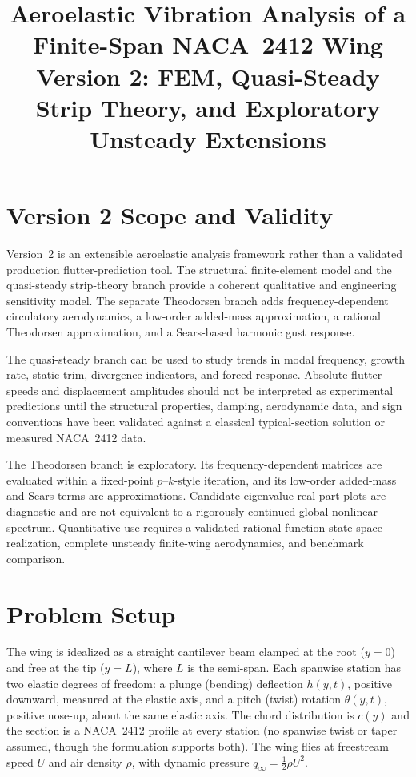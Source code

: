\documentclass[11pt]{article}
\title{Aeroelastic Vibration Analysis of a Finite-Span NACA~2412 Wing\\[4pt]
\large Version 2: FEM, Quasi-Steady Strip Theory, and Exploratory Unsteady Extensions}
\author{}
\date{}
\begin{document}
\maketitle

\section*{Version 2 Scope and Validity}

Version~2 is an extensible aeroelastic analysis framework rather than a validated
production flutter-prediction tool. The structural finite-element model and the
quasi-steady strip-theory branch provide a coherent qualitative and engineering
sensitivity model. The separate Theodorsen branch adds frequency-dependent circulatory
aerodynamics, a low-order added-mass approximation, a rational Theodorsen approximation,
and a Sears-based harmonic gust response.

The quasi-steady branch can be used to study trends in modal frequency, growth rate,
static trim, divergence indicators, and forced response. Absolute flutter speeds and
displacement amplitudes should not be interpreted as experimental predictions until the
structural properties, damping, aerodynamic data, and sign conventions have been
validated against a classical typical-section solution or measured NACA~2412 data.

The Theodorsen branch is exploratory. Its frequency-dependent matrices are evaluated
within a fixed-point $p$--$k$-style iteration, and its low-order added-mass and Sears
terms are approximations. Candidate eigenvalue real-part plots are diagnostic and are
not equivalent to a rigorously continued global nonlinear spectrum. Quantitative use
requires a validated rational-function state-space realization, complete unsteady
finite-wing aerodynamics, and benchmark comparison.

\section{Problem Setup}

The wing is idealized as a straight cantilever beam clamped at the root ($y=0$) and
free at the tip ($y=L$), where $L$ is the semi-span. Each spanwise station has two
elastic degrees of freedom: a plunge (bending) deflection $h(y,t)$, positive downward,
measured at the elastic axis, and a pitch (twist) rotation $\theta(y,t)$, positive
nose-up, about the same elastic axis. The chord distribution is $c(y)$ and the section
is a NACA~2412 profile at every station (no spanwise twist or taper assumed, though the
formulation supports both). The wing flies at freestream speed $U$ and air density
$\rho$, with dynamic pressure $q_\infty = \tfrac12 \rho U^2$.
\end{document}
